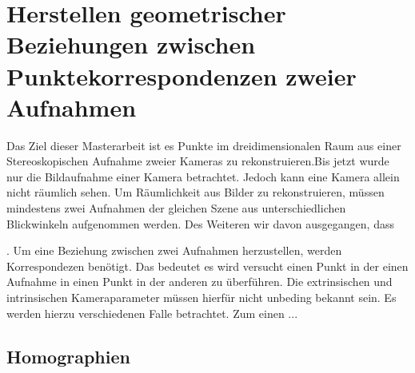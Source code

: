 \chapter{Herstellen geometrischer Beziehungen zwischen Punktekorrespondenzen zweier Aufnahmen}

Das Ziel dieser Masterarbeit ist es Punkte im dreidimensionalen Raum aus einer Stereoskopischen Aufnahme zweier Kameras zu rekonstruieren.Bis jetzt wurde nur die Bildaufnahme einer Kamera betrachtet. Jedoch kann eine Kamera allein nicht räumlich sehen. Um Räumlichkeit aus Bilder zu rekonstruieren, müssen mindestens zwei Aufnahmen der gleichen Szene aus unterschiedlichen Blickwinkeln aufgenommen werden. Des Weiteren wir davon ausgegangen, dass

 . Um eine Beziehung zwischen zwei Aufnahmen herzustellen, werden Korrespondezen benötigt.  Das bedeutet es wird versucht einen Punkt in der einen Aufnahme in einen Punkt in der anderen zu überführen. Die extrinsischen und intrinsischen Kameraparameter müssen hierfür nicht unbeding bekannt sein. Es werden hierzu verschiedenen Falle betrachtet. Zum einen ...

\section{Homographien}
\label{sec:homographien} 

